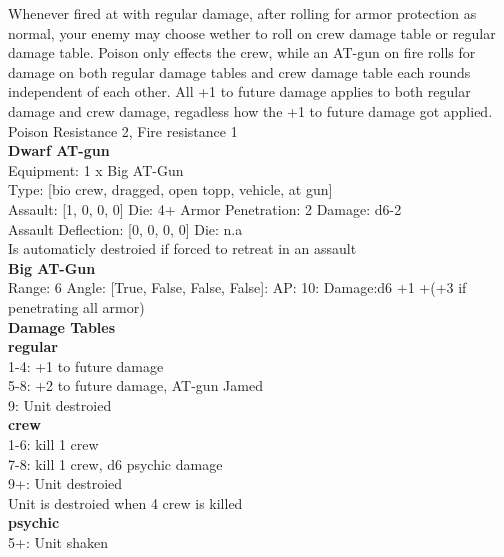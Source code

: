Whenever fired at with regular damage, after rolling for armor protection as normal, your enemy may choose wether to roll on crew damage table or regular damage table. Poison only effects the crew, while an AT-gun on fire rolls for damage on both regular damage tables and crew damage table each rounds independent of each other. All +1 to future damage applies to both regular damage and crew damage, regadless how the +1 to future damage got applied.\\ 
 Poison Resistance 2, Fire resistance 1\\ 


{\bf Dwarf AT-gun } \\
Equipment: 1 x Big AT-Gun \\
Type: [bio crew, dragged, open topp, vehicle, at gun] \\

Assault: [1, 0, 0, 0] Die: 4+ Armor Penetration: 2 Damage: d6-2 \\
Assault Deflection: [0, 0, 0, 0] Die: n.a\\
\indent Is automaticly destroied if forced to retreat in an assault\\ 
 



{\bf Big AT-Gun } \\



Range: 6  Angle: [True, False, False, False]: AP: 10: Damage:d6 +1 +(+3 if penetrating all armor) \\




 





{\bf Damage Tables} \\
 {\bf regular } \\
1-4: +1 to future damage \\
5-8: +2 to future damage, AT-gun Jamed \\
9: Unit destroied \\
 {\bf crew } \\
1-6: kill 1 crew \\
7-8: kill 1 crew, d6 psychic damage \\
9+: Unit destroied \\
Unit is destroied when 4 crew is killed\\
 {\bf psychic } \\
5+: Unit shaken \\










